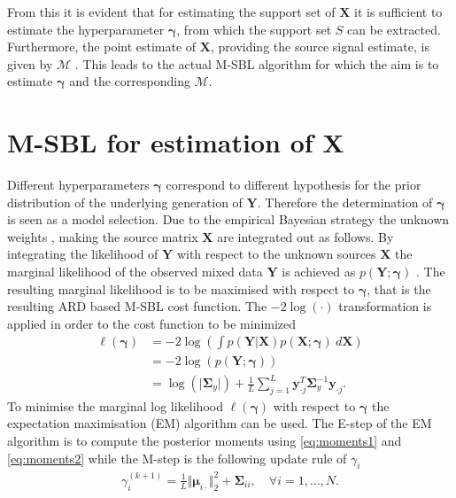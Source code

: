 From this it is evident that for estimating the support set of $\mathbf{X}$ it is sufficient to estimate the hyperparameter $\boldsymbol{\gamma}$, from which the support set $S$ can be extracted. Furthermore, the point estimate of $\mathbf{X}$, providing the source signal estimate, is given by $\mathcal{M}$ \cite[p. 147]{phd_wipf}. 
This leads to the actual M-SBL algorithm for which the aim is to estimate $\boldsymbol{\gamma}$ and the corresponding $\mathcal{M}$.

\section{M-SBL for estimation of $\textbf{X}$}
Different hyperparameters $\boldsymbol{\gamma}$ correspond to different hypothesis for the prior distribution of the underlying generation of $\mathbf{Y}$. 
Therefore the determination of $\boldsymbol{\gamma}$ is seen as a model selection.
Due to the empirical Bayesian strategy the unknown weights , making the source matrix $\mathbf{X}$ are integrated out as follows.
By integrating the likelihood of $\mathbf{Y}$ with respect to the unknown sources $\mathbf{X}$ the marginal likelihood of the observed mixed data $\mathbf{Y}$ is achieved as $p (\mathbf{Y} ; \boldsymbol{\gamma})$ \cite[p. 146]{phd_wipf}. 
The resulting marginal likelihood is to be maximised with respect to $\boldsymbol{\gamma}$, that is the resulting ARD based M-SBL cost function.
The $-2 \log (\cdot)$ transformation is applied in order to the cost function to be minimized
\begin{align*}
\ell(\boldsymbol{\gamma}) &= -2 \log \left( \int p (\mathbf{Y}  \vert \mathbf{X}) p (\mathbf{X} ; \boldsymbol{\gamma}) \ d\mathbf{X} \right) \\
&= - 2 \log(p (\mathbf{Y} ; \boldsymbol{\gamma}))\\
&= \log ( \vert \boldsymbol{\Sigma}_y \vert) + \frac{1}{L} \sum_{j=1}^L \mathbf{y}_{\cdot j}^T \boldsymbol{\Sigma}_y ^{-1} \mathbf{y}_{\cdot j}.
\end{align*}
To minimise the marginal log likelihood $\ell(\boldsymbol{\gamma})$ with respect to $\boldsymbol{\gamma}$ the expectation maximisation (EM) algorithm can be used. 
The E-step of the EM algorithm is to compute the posterior moments using \eqref{eq:moments1} and \eqref{eq:moments2} while the M-step is the following update rule of $\gamma_i$ \cite[p.147]{phd_wipf}
\begin{align*}
\gamma_i^{(k+1)} = \frac{1}{L} \Vert \boldsymbol{\mu}_{i \cdot} \Vert_2^2 + \boldsymbol{\Sigma}_{ii}, \quad \forall i = 1, \dots, N.
\end{align*}
